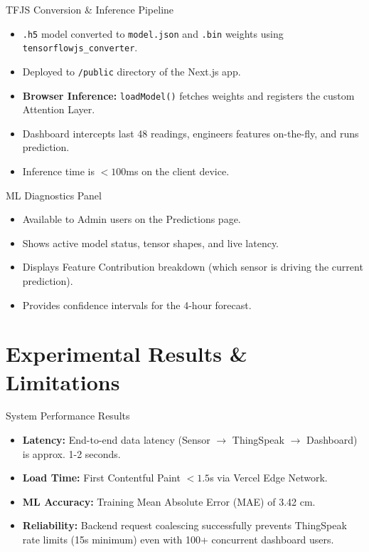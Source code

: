 \documentclass[aspectratio=169]{beamer}
\begin{document}
\begin{frame}{TFJS Conversion \& Inference Pipeline}
  \begin{itemize}
    \item \texttt{.h5} model converted to \texttt{model.json} and \texttt{.bin} weights using \texttt{tensorflowjs\_converter}.
    \item Deployed to \texttt{/public} directory of the Next.js app.
    \item \textbf{Browser Inference:} \texttt{loadModel()} fetches weights and registers the custom Attention Layer.
    \item Dashboard intercepts last 48 readings, engineers features on-the-fly, and runs prediction.
    \item Inference time is $< 100$ms on the client device.
  \end{itemize}
\end{frame}

\begin{frame}{ML Diagnostics Panel}
  \begin{itemize}
    \item Available to Admin users on the Predictions page.
    \item Shows active model status, tensor shapes, and live latency.
    \item Displays Feature Contribution breakdown (which sensor is driving the current prediction).
    \item Provides confidence intervals for the 4-hour forecast.
  \end{itemize}
\end{frame}

\section{Experimental Results \& Limitations}

\begin{frame}{System Performance Results}
  \begin{itemize}
    \item \textbf{Latency:} End-to-end data latency (Sensor $\rightarrow$ ThingSpeak $\rightarrow$ Dashboard) is approx. 1-2 seconds.
    \item \textbf{Load Time:} First Contentful Paint $< 1.5$s via Vercel Edge Network.
    \item \textbf{ML Accuracy:} Training Mean Absolute Error (MAE) of 3.42 cm.
    \item \textbf{Reliability:} Backend request coalescing successfully prevents ThingSpeak rate limits (15s minimum) even with 100+ concurrent dashboard users.
  \end{itemize}
\end{frame}
\end{document}
